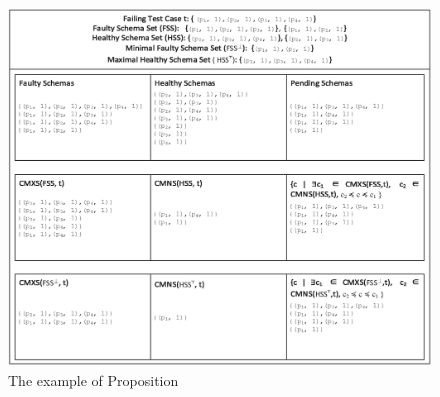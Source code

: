 {%

\begin{figure}[ht]
 \centering
 \includegraphics[width=5.6in]{minmax.eps}
 \caption{The example of Proposition }
 \label{fig_minmax}
\end{figure}


%
%

}
